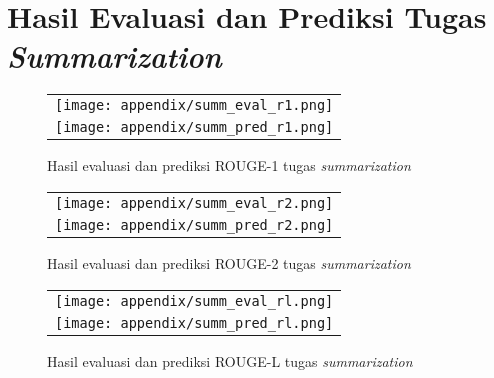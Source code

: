 \chapter{Hasil Evaluasi dan Prediksi Tugas \textit{Summarization}}
\label{appendix:summarization}

\begin{figure}[h]
    \centering
    \begin{longtable}{c}
        \texttt{[image: appendix/summ\_eval\_r1.png]} \\
        \texttt{[image: appendix/summ\_pred\_r1.png]} \\
    \end{longtable}
    \caption{Hasil evaluasi dan prediksi ROUGE-1 tugas \textit{summarization}}
\end{figure}

\begin{figure}[h]
    \centering
    \begin{longtable}{c}
        \texttt{[image: appendix/summ\_eval\_r2.png]} \\
        \texttt{[image: appendix/summ\_pred\_r2.png]} \\
    \end{longtable}
    \caption{Hasil evaluasi dan prediksi ROUGE-2 tugas \textit{summarization}}
\end{figure}

\begin{figure}[h]
    \centering
    \begin{longtable}{c}
        \texttt{[image: appendix/summ\_eval\_rl.png]} \\
        \texttt{[image: appendix/summ\_pred\_rl.png]} \\
    \end{longtable}
    \caption{Hasil evaluasi dan prediksi ROUGE-L tugas \textit{summarization}} \end{figure}
